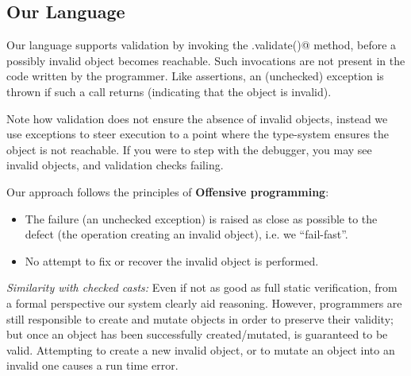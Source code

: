\subsection{Our Language}
Our language supports validation by invoking the \Q@.validate()@ method, before a possibly invalid object becomes reachable. Such invocations are not present in the code written by the programmer. 
Like assertions, an (unchecked) exception is thrown if such a call returns \Q@false@ (indicating that the object is invalid).

Note how validation does not ensure the absence of invalid objects, instead we use exceptions to steer execution to a point where the type-system ensures the object is not reachable.
If you were to step with the debugger, you may see invalid objects, and validation checks failing.

\noindent Our approach follows the principles of \textbf{Offensive programming}:
\begin{itemize}
\item The failure (an unchecked exception)
is raised as close as possible to the defect (the operation creating an invalid object), i.e. we ``fail-fast''.
\item No attempt to fix or recover the invalid object is performed.
\end{itemize}


%
\noindent\textit{Similarity with checked casts:}%
 Even if not as good as full static verification, from a formal perspective
 our system clearly aid reasoning.
However, programmers are still responsible to create and mutate objects in order to preserve their validity;
but once an object has been successfully created/mutated, is guaranteed to be valid.
Attempting to create a new invalid object, or to mutate an object into an invalid one causes
a run time error.

